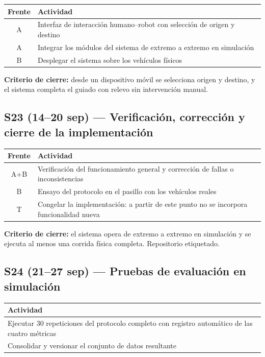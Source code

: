 \documentclass[12pt,letterpaper]{article}
\begin{document}
\begin{table}[H]
    \centering
    \small
    \begin{tabular}{@{}cp{12.8cm}@{}}
        \toprule
        \textbf{Frente} & \textbf{Actividad} \\ \midrule
        A & Interfaz de interacción humano--robot con selección de origen y destino \\
        A & Integrar los módulos del sistema de extremo a extremo en simulación \\
        B & Desplegar el sistema sobre los vehículos físicos \\ \bottomrule
    \end{tabular}
\end{table}

\textbf{Criterio de cierre:} desde un dispositivo móvil se selecciona origen y destino, y el sistema completa el guiado con relevo sin intervención manual.

\subsection{S23 (14--20 sep) --- Verificación, corrección y cierre de la implementación}

\begin{table}[H]
    \centering
    \small
    \begin{tabular}{@{}cp{12.8cm}@{}}
        \toprule
        \textbf{Frente} & \textbf{Actividad} \\ \midrule
        A+B & Verificación del funcionamiento general y corrección de fallas o inconsistencias \\
        B & Ensayo del protocolo en el pasillo con los vehículos reales \\
        T & Congelar la implementación: a partir de este punto no se incorpora funcionalidad nueva \\ \bottomrule
    \end{tabular}
\end{table}

\textbf{Criterio de cierre:} el sistema opera de extremo a extremo en simulación y se ejecuta al menos una corrida física completa. Repositorio etiquetado.

\subsection{S24 (21--27 sep) --- Pruebas de evaluación en simulación}

\begin{table}[H]
    \centering
    \small
    \begin{tabular}{@{}p{13.8cm}@{}}
        \toprule
        \textbf{Actividad} \\ \midrule
        Ejecutar 30 repeticiones del protocolo completo con registro automático de las cuatro métricas \\
        Consolidar y versionar el conjunto de datos resultante \\ \bottomrule
    \end{tabular}
\end{table}
\end{document}

